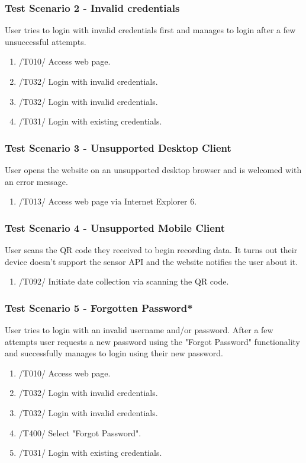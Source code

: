 \subsubsection{Test Scenario 2 - Invalid credentials}
User tries to login with invalid credentials first and manages to login after a few unsuccessful attempts.
\begin{enumerate}
    \item /T010/ Access web page.
    \item /T032/ Login with invalid credentials.
    \item /T032/ Login with invalid credentials.
    \item /T031/ Login with existing credentials.
\end{enumerate}
\subsubsection{Test Scenario 3 - Unsupported Desktop Client}
User opens the website on an unsupported desktop browser and is welcomed with an error message.
\begin{enumerate}
    \item /T013/ Access web page via Internet Explorer 6.
\end{enumerate} 
\subsubsection{Test Scenario 4 - Unsupported Mobile Client}
User scans the \gls{QR code} they received to begin recording data. It turns out their device doesn't support the \Gls{sensor} API and the website notifies the user about it.
\begin{enumerate}
    \item /T092/ Initiate date collection via scanning the \gls{QR code}.
\end{enumerate}
\subsubsection{Test Scenario 5 - Forgotten Password*}
User tries to login with an invalid username and/or password. After a few attempts user requests a new password using the "Forgot Password" functionality and successfully manages to login using their new password.
\begin{enumerate}
    \item /T010/ Access web page.
    \item /T032/ Login with invalid credentials.
    \item /T032/ Login with invalid credentials.
    \item /T400/ Select "Forgot Password".
    \item /T031/ Login with existing credentials.
\end{enumerate} 
